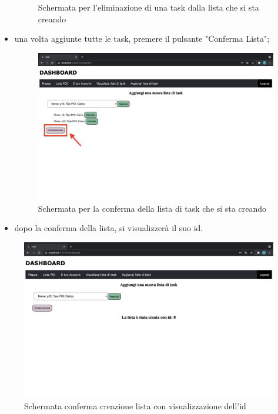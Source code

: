 \begin{itemize}
\begin{figure}[H]
        \caption{Schermata per l'eliminazione di una task dalla lista che si sta creando}
    \end{figure}
    \item una volta aggiunte tutte le task, premere il pulsante "Conferma Lista";
    \begin{figure}[H]
        \centering
        \includegraphics[scale=0.12]{res/images/confermalista.png}
        \caption{Schermata per la conferma della lista di task che si sta creando}
    \end{figure}
    \item dopo la conferma della lista, si visualizzerà il suo id.
    
\end{itemize}
\begin{figure}[H]
    \centering
    \includegraphics[scale=0.2]{res/images/listacreata.png}
    \caption{Schermata conferma creazione lista con visualizzazione dell'id}
\end{figure}
